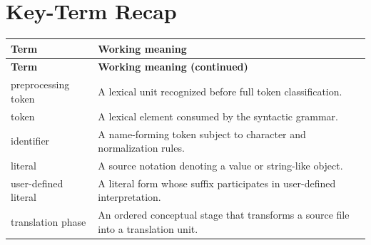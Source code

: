\documentclass[11pt,letterpaper]{article}
\begin{document}
\section{Key-Term Recap}
\begin{longtable}{@{}>{\RaggedRight\arraybackslash}p{}>{\RaggedRight\arraybackslash}p{}@{}}\toprule\textbf{Term} & \textbf{Working meaning}\\\midrule\endfirsthead\toprule\textbf{Term} & \textbf{Working meaning (continued)}\\\midrule\endhead\bottomrule\endfoot
preprocessing token & A lexical unit recognized before full token classification.\\
token & A lexical element consumed by the syntactic grammar.\\
identifier & A name-forming token subject to character and normalization rules.\\
literal & A source notation denoting a value or string-like object.\\
user-defined literal & A literal form whose suffix participates in user-defined interpretation.\\
translation phase & An ordered conceptual stage that transforms a source file into a translation unit.\\
\end{longtable}
\end{document}
